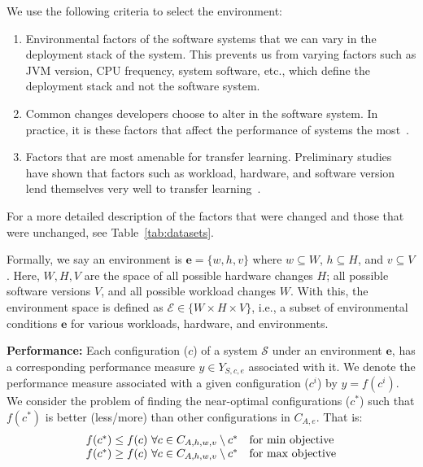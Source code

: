 \documentclass[10pt,journal,compsoc]{IEEEtran}
\newcommand{\be}{\begin{enumerate}}
\newcommand{\ee}{\end{enumerate}}
\begin{document}
\noindent We use the following criteria to select the  environment:
\be[leftmargin=*]
    \item Environmental factors of the software systems that we can vary in the deployment stack of the system. This prevents us from varying factors such as JVM version, CPU frequency, system software, etc., which define the deployment stack and not the software system. 
    \item Common changes developers choose to alter in the software system. In practice, it is these factors that affect the performance of systems the most~\cite{jamshidi2017transfer2, jamshidi2017transfer, valov2017transferring, valov2015}. 
    \item Factors that are most amenable for transfer learning. Preliminary studies have shown that factors such as workload, hardware, and software version lend themselves very well to transfer learning~\cite{jamshidi2017transfer2, jamshidi2017transfer}.
\ee
For a more detailed description of the factors that were changed and those that were unchanged, see Table~\ref{tab:datasets}.

Formally, we say an environment is   $\mathit{\mathbf{e}}=\{w, h, v\}$ where $w \subseteq W$, $h \subseteq H$, and $v \subseteq V$. Here, $W, H, V$ are the space of all possible hardware changes $H$;   all possible software versions $V$, and all possible workload changes  $W$. With this, the environment space is defined as $\mathcal{E}\in\{W\times H\times V\}$, i.e., a subset of environmental conditions $\mathit{\mathbf{e}}$ for various workloads, hardware, and environments.

\noindent\textbf{Performance: } 
Each configuration ($c$) of a system $\mathcal{S}$ under an environment $\mathit{\mathbf{e}}$, 
has a corresponding performance measure $y \in Y_{S,c,e}$ associated with it. 
We denote the performance 
measure associated with a given configuration ($c^i$) by $y=f(c^i)$.  We 
consider the problem of finding the near-optimal configurations ($c^{*}$) such 
that $f(c^{*})$ is better (less/more) than other configurations in $C_{A,e}$. That is:
\begin{equation*}
\centering
     {\begin{array}{*{20}{l}}
     \centering
{f(c^{*}) \le f(c){\rm{~}}\forall c \in {C_{A,h,w,v}}\setminus c^{*} }&{{\text {for min objective}}}\\
{f(c^{*}) \ge f(c){\rm{~}}\forall c \in {C_{A,h,w,v}}\setminus c^{*} }&{{\text {for max objective}}}
\end{array}}
\end{equation*}
\end{document}
